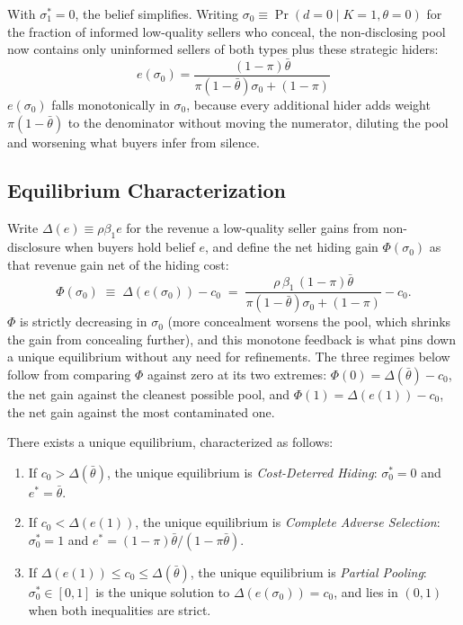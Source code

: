 With $\sigma_1^*=0$, the belief simplifies. Writing $\sigma_0\equiv\Pr(d=0\mid K=1,\theta=0)$ for the fraction of informed low-quality sellers who conceal, the non-disclosing pool now contains only uninformed sellers of both types plus these strategic hiders:
\begin{equation}
    e(\sigma_0) = \frac{(1-\pi)\bar{\theta}}{\pi(1-\bar{\theta})\sigma_0 + (1-\pi)}
    \label{eq:belief_simplified}
\end{equation}
$e(\sigma_0)$ falls monotonically in $\sigma_0$, because every additional hider adds weight $\pi(1-\bar{\theta})$ to the denominator without moving the numerator, diluting the pool and worsening what buyers infer from silence.

\subsection{Equilibrium Characterization}

Write $\Delta(e)\equiv\rho\beta_1 e$ for the revenue a low-quality seller gains from non-disclosure when buyers hold belief $e$, and define the net hiding gain $\Phi(\sigma_0)$ as that revenue gain net of the hiding cost:
\begin{equation}
    \Phi(\sigma_0) \;\equiv\; \Delta\!\left(e(\sigma_0)\right) - c_0 \;=\; \frac{\rho\,\beta_1\,(1-\pi)\bar{\theta}}{\pi(1-\bar{\theta})\sigma_0 + (1-\pi)} - c_0.
    \label{eq:Phi}
\end{equation}
$\Phi$ is strictly decreasing in $\sigma_0$ (more concealment worsens the pool, which shrinks the gain from concealing further), and this monotone feedback is what pins down a unique equilibrium without any need for refinements. The three regimes below follow from comparing $\Phi$ against zero at its two extremes: $\Phi(0)=\Delta(\bar{\theta})-c_0$, the net gain against the cleanest possible pool, and $\Phi(1)=\Delta(e(1))-c_0$, the net gain against the most contaminated one.

\begin{proposition}
\label{prop:equilibrium}
There exists a unique equilibrium, characterized as follows:
\begin{enumerate}[label=(\roman*)]
    \item If $c_0>\Delta(\bar{\theta})$, the unique equilibrium is \emph{Cost-Deterred Hiding}: $\sigma_0^*=0$ and $e^*=\bar{\theta}$.
    \item If $c_0<\Delta(e(1))$, the unique equilibrium is \emph{Complete Adverse Selection}: $\sigma_0^*=1$ and $e^*=(1-\pi)\bar{\theta}/(1-\pi\bar{\theta})$.
    \item If $\Delta(e(1))\leq c_0\leq\Delta(\bar{\theta})$, the unique equilibrium is \emph{Partial Pooling}: $\sigma_0^*\in[0,1]$ is the unique solution to $\Delta(e(\sigma_0))=c_0$, and lies in $(0,1)$ when both inequalities are strict.
\end{enumerate}
\end{proposition}

